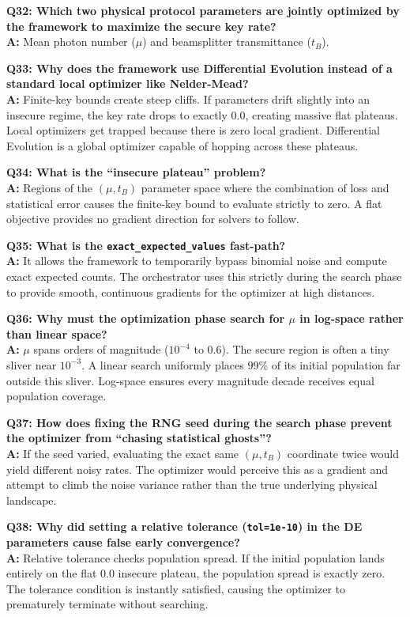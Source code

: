 \documentclass[11pt, a4paper]{article}
\begin{document}
\textbf{Q32: Which two physical protocol parameters are jointly optimized by the framework to maximize the secure key rate?} \\
\textbf{A:} Mean photon number ($\mu$) and beamsplitter transmittance ($t_B$).

\textbf{Q33: Why does the framework use Differential Evolution instead of a standard local optimizer like Nelder-Mead?} \\
\textbf{A:} Finite-key bounds create steep cliffs. If parameters drift slightly into an insecure regime, the key rate drops to exactly 0.0, creating massive flat plateaus. Local optimizers get trapped because there is zero local gradient. Differential Evolution is a global optimizer capable of hopping across these plateaus.

\textbf{Q34: What is the ``insecure plateau'' problem?} \\
\textbf{A:} Regions of the $(\mu, t_B)$ parameter space where the combination of loss and statistical error causes the finite-key bound to evaluate strictly to zero. A flat objective provides no gradient direction for solvers to follow.

\textbf{Q35: What is the \texttt{exact\_expected\_values} fast-path?} \\
\textbf{A:} It allows the framework to temporarily bypass binomial noise and compute exact expected counts. The orchestrator uses this strictly during the search phase to provide smooth, continuous gradients for the optimizer at high distances.

\textbf{Q36: Why must the optimization phase search for $\mu$ in log-space rather than linear space?} \\
\textbf{A:} $\mu$ spans orders of magnitude ($10^{-4}$ to $0.6$). The secure region is often a tiny sliver near $10^{-3}$. A linear search uniformly places $99\%$ of its initial population far outside this sliver. Log-space ensures every magnitude decade receives equal population coverage.

\textbf{Q37: How does fixing the RNG seed during the search phase prevent the optimizer from ``chasing statistical ghosts''?} \\
\textbf{A:} If the seed varied, evaluating the exact same $(\mu, t_B)$ coordinate twice would yield different noisy rates. The optimizer would perceive this as a gradient and attempt to climb the noise variance rather than the true underlying physical landscape.

\textbf{Q38: Why did setting a relative tolerance (\texttt{tol=1e-10}) in the DE parameters cause false early convergence?} \\
\textbf{A:} Relative tolerance checks population spread. If the initial population lands entirely on the flat 0.0 insecure plateau, the population spread is exactly zero. The tolerance condition is instantly satisfied, causing the optimizer to prematurely terminate without searching.
\end{document}
